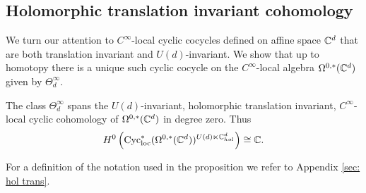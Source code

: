 \subsection{Holomorphic translation invariant cohomology}

We turn our attention to $C^\infty$-local cyclic cocycles defined on affine space $\mathbb C^d$ that are both translation invariant and $U(d)$-invariant. 
We show that up to homotopy there is a unique such cyclic cocycle on the $C^\infty$-local algebra  $\Omega^{0,*}(\mathbb C^d)$ given by $\Theta^\infty_d$. 

\begin{prop}\label{prop: cyctrans}
The class $\Theta^\infty_d$ spans the $U(d)$-invariant, holomorphic translation invariant, $C^\infty$-local cyclic cohomology of $\Omega^{0,*}(\mathbb C^d)$ in degree zero.
Thus
\[
H^0\left({\rm Cyc}_{\rm loc}^*(\Omega^{0,*}(\mathbb C^d))^{U(d) \ltimes \mathbb C^d_{hol}} \right) \cong \mathbb C .
\] 
\end{prop}

For a definition of the notation used in the proposition we refer to Appendix \ref{sec: hol trans}.

